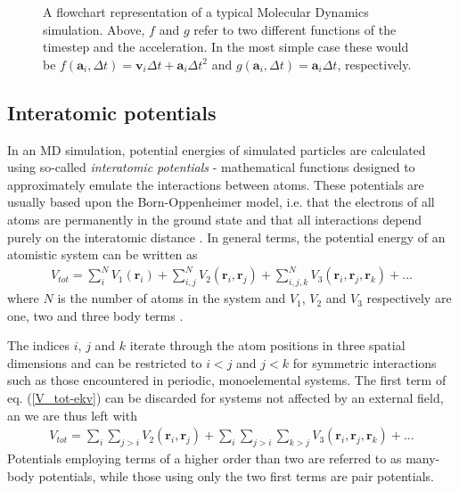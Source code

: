\begin{figure}
\begin{center}
\endgroup
\caption{A flowchart representation of a typical Molecular Dynamics simulation. Above, $f$ and $g$ refer to two different functions of the timestep and the acceleration. In the most simple case these would be $f(\mathbf{a}_i,\Delta t) = \mathbf{v}_i\Delta t + \mathbf{a}_i\Delta t^2$ and $g(\mathbf{a}_i,\Delta t) = \mathbf{a}_i\Delta t$, respectively.} 
\label{MD-schema}
\end{center}
\end{figure}


\subsection{Interatomic potentials}

In an MD simulation, potential energies of simulated particles are calculated using so-called \textit{interatomic potentials} - mathematical functions designed to approximately emulate the interactions between atoms. 
These potentials are usually based upon the Born-Oppenheimer model, i.e. that the electrons of all atoms are permanently in the ground state and that all interactions depend purely on the interatomic distance \cite{born1927quantentheorie}. 
In general terms, the potential energy of an atomistic system can be written as
\begin{align}
V_{tot} = \sum_i^N V_1(\mathbf{r}_i) + \sum_{i,j}^N V_2(\mathbf{r}_i, \mathbf{r}_j) +  \sum_{i,j,k}^N V_3(\mathbf{r}_i, \mathbf{r}_j, \mathbf{r}_k) + ...
\label{V_tot-ekv}
\end{align}
where $N$ is the number of atoms in the system and $V_1$, $V_2$ and $V_3$ respectively are one, two and three body terms \cite{potentialsTheory}.

The indices $i$, $j$ and $k$ iterate through the atom positions in three spatial dimensions and can be restricted to $i < j$ and $j < k$ for symmetric interactions such as those encountered in periodic, monoelemental systems. 
The first term of eq. (\ref{V_tot-ekv}) can be discarded for systems not affected by an external field, an we are thus left with
\begin{align}
V_{tot} = \sum_i \sum_{j>i} V_2(\mathbf{r}_i, \mathbf{r}_j) + \sum_i \sum_{j>i} \sum_{k > j} V_3(\mathbf{r}_i, \mathbf{r}_j, \mathbf{r}_k) + ...
\end{align}
Potentials employing terms of a higher order than two are referred to as many-body potentials, while those using only the two first terms are pair potentials.

